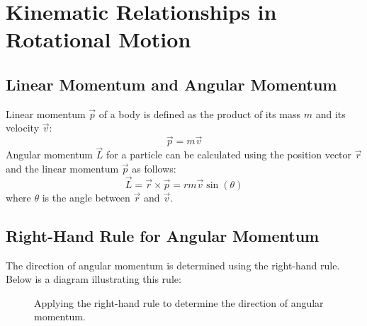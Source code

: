 \documentclass[12pt]{article}
\begin{document}
\section{Kinematic Relationships in Rotational Motion}
\subsection{Linear Momentum and Angular Momentum}
Linear momentum \(\vec{p}\) of a body is defined as the product of its mass \(m\) and its velocity \(\vec{v}\):
\[
\vec{p} = m\vec{v}
\]
Angular momentum \(\vec{L}\) for a particle can be calculated using the position vector \(\vec{r}\) and the linear momentum \(\vec{p}\) as follows:
\[
\vec{L} = \vec{r} \times \vec{p} = r m \vec{v} \sin(\theta)
\]
where \(\theta\) is the angle between \(\vec{r}\) and \(\vec{v}\).

\subsection{Right-Hand Rule for Angular Momentum}
The direction of angular momentum is determined using the right-hand rule. Below is a diagram illustrating this rule:

\begin{figure}[h]
\centering
{}
\caption{Applying the right-hand rule to determine the direction of angular momentum.}
\end{figure}
\end{document}
